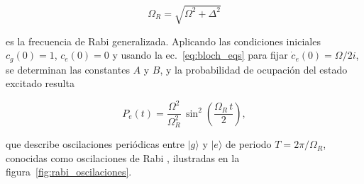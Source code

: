 \begin{equation}
	\Omega_R = \sqrt{\Omega^2 + \Delta^2}
	\label{eq:omega_R}
\end{equation}

es la frecuencia de Rabi generalizada. Aplicando las condiciones iniciales $c_g(0) = 1$, $c_e(0) = 0$ y usando la ec.~\eqref{eq:bloch_eqs} para fijar $\dot{c}_e(0) = \Omega/2i$, se determinan las constantes $A$ y $B$, y la probabilidad de ocupación del estado excitado resulta

\begin{equation}
	P_e(t) = \frac{\Omega^2}{\Omega_R^2}\,\sin^2\!\left(\frac{\Omega_R\,t}{2}\right),
	\label{eq:Pe}
\end{equation}

que describe oscilaciones periódicas entre $|g\rangle$ y $|e\rangle$ de periodo $T = 2\pi/\Omega_R$, conocidas como oscilaciones de Rabi \cite{gerry2005,fox2006}, ilustradas en la figura~\ref{fig:rabi_oscilaciones}.

